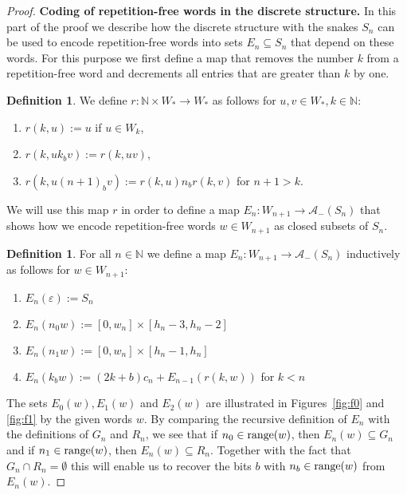 \documentclass[a4paper]{amsart}
\def\AA{{\mathcal A}}
\def\IN{{\mathbb{N}}}
\def\In{\subseteq}
\def\range{{\rm range}}
\theoremstyle{definition}
\newtheorem{localdef}[localclaim]{Definition}
\begin{document}
\begin{proof}
\noindent
{\bf Coding of repetition-free words in the discrete structure.}
In this part of the proof we describe how the discrete structure with the 
snakes $S_n$ can be used to encode repetition-free words into sets $E_n\In S_n$ that depend on these words. 
For this purpose we first define a map that removes the number $k$ from
a repetition-free word and decrements all entries that are greater than $k$ by one.

\begin{localdef}
We define $r : \mathbb{N} \times W_* \to W_*$ as follows
for $u,v\in W_*,k\in\IN$:
\begin{enumerate}
\item $r(k,u) := u$ if $u \in W_{k}$,
\item $r(k,uk_bv) := r(k,uv)$,
\item $r(k,u(n+1)_bv) := r(k,u)n_br(k,v)$ for $n+1>k$.
\end{enumerate}
\end{localdef}

We will use this map $r$ in order to define a map $E_n:W_{n+1}\to\AA_-(S_n)$ that shows
how we encode repetition-free words $w\in W_{n+1}$ as closed subsets of $S_n$.

\begin{localdef}
\label{def:En}
For all $n\in\IN$ we define a map $E_n:W_{n+1}\to\AA_-(S_n)$ inductively as follows for $w\in W_{n+1}$: 
\begin{enumerate}
\item $E_n(\varepsilon) := S_n$
\item $E_n(n_0w) := [0,w_n] \times [h_n-3,h_n-2]$
\item $E_n(n_1w) := [0,w_n] \times [h_n-1,h_n]$
\item $E_n(k_bw) := (2k+b)c_n + E_{n-1}(r(k,w))$ for $k < n$
\end{enumerate}
\end{localdef}

The sets $E_0(w), E_1(w)$ and $E_2(w)$ are illustrated in Figures~\ref{fig:f0} and \ref{fig:f1} by the given words $w$.
By comparing the recursive definition of $E_n$ with the definitions of $G_n$ and $R_n$, we see that if $n_0 \in\range(w)$, 
then $E_n(w) \subseteq G_n$ and if $n_1 \in \range(w)$, then $E_n(w) \subseteq R_n$. 
Together with the fact that $G_n\cap R_n=\emptyset$ this will enable us to recover the bits $b$ with $n_b\in\range(w)$
from $E_n(w)$. 


\end{proof}
\end{document}
